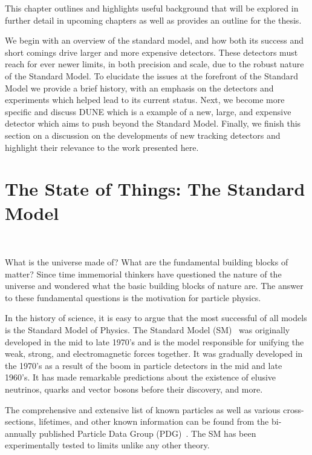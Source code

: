 This chapter outlines and highlights useful background that will be explored in further detail in upcoming chapters as well as provides an outline for the thesis.

We begin with an overview of the standard model, and how both its success and short comings drive larger and more expensive detectors.
These detectors must reach for ever newer limits, in both precision and scale, due to the robust nature of the Standard Model.
To elucidate the issues at the forefront of the Standard Model we provide a brief history, with an emphasis on the detectors and experiments which helped lead to its current status.
Next, we become more specific and discuss DUNE which is a example of a new, large, and expensive detector which aims to push beyond the Standard Model.
Finally, we finish this section on a discussion on the developments of new tracking detectors and highlight their relevance to the work presented here.

\section{The State of Things: The Standard Model}
~\label{sec:intro_now}

What is the universe made of?
What are the fundamental building blocks of matter?
Since time immemorial thinkers have questioned the nature of the universe and wondered what the basic building blocks of nature are.
The answer to these fundamental questions is the motivation for particle physics.

In the history of science, it is easy to argue that the most successful of all models is the Standard Model of Physics.
The Standard Model (SM)~\citep{GLASHOW1961579, salam1964electromagnetic, weinberg1967model} was originally developed in the mid to late 1970's and is the model responsible for unifying the weak, strong, and electromagnetic forces together.
It was gradually developed in the 1970's as a result of the boom in particle detectors in the mid and late 1960's.
It has made remarkable predictions about the existence of elusive neutrinos, quarks and vector bosons before their discovery, and more.

The comprehensive and extensive list of known particles as well as various cross-sections, lifetimes, and other known information can be found from the bi-annually published Particle Data Group (PDG)~\citep{Workman:2022ynf}.
The SM has been experimentally tested to limits unlike any other theory.

